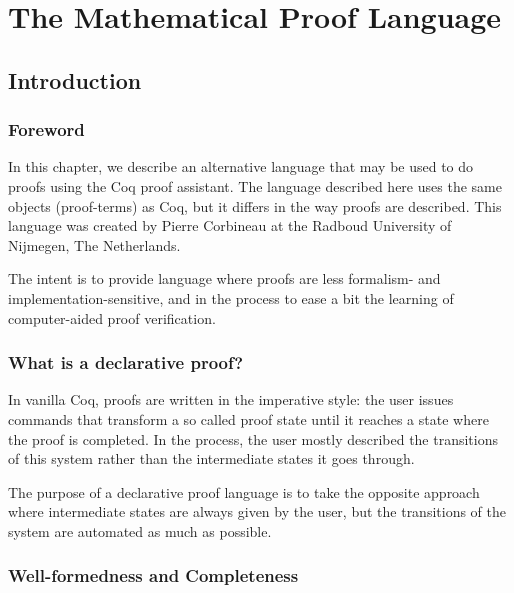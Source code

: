 \newcommand{\DPL}{Mathematical Proof Language}

\chapter{The \DPL\label{DPL}}

\section{Introduction}

\subsection{Foreword}

In this chapter, we describe an alternative language that may be used
to do proofs using the Coq proof assistant.  The language described
here uses the same objects (proof-terms) as Coq, but it differs in the
way proofs are described. This language was created by Pierre
Corbineau at the Radboud University of Nijmegen, The Netherlands.

The intent is to provide language where proofs are less formalism-{}
and implementation-{}sensitive, and in the process to ease a bit the
learning of computer-{}aided proof verification.

\subsection{What is a declarative proof?}
In vanilla Coq, proofs are written in the imperative style: the user
issues commands that transform a so called proof state until it
reaches a state where the proof is completed. In the process, the user
mostly described the transitions of this system rather than the
intermediate states it goes through.

The purpose of a declarative proof language is to take the opposite
approach where intermediate states are always given by the user, but
the transitions of the system are automated as much as possible.

\subsection{Well-formedness and Completeness}

